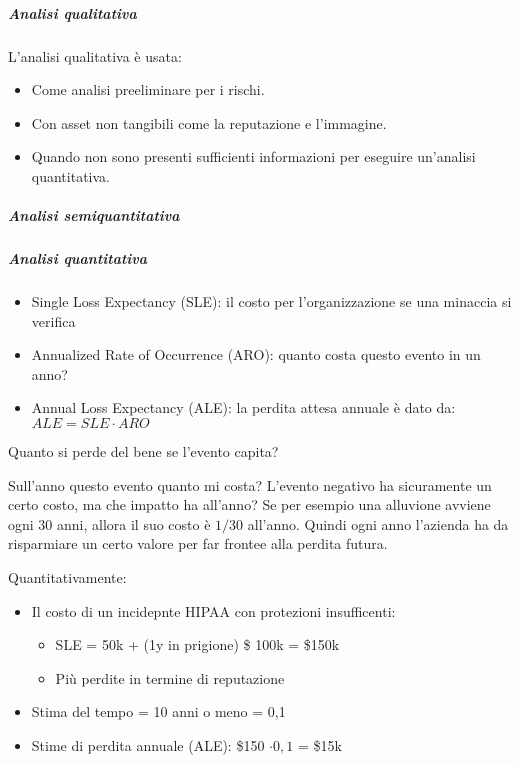 \subparagraph*{Analisi qualitativa}

L'analisi qualitativa è usata:
\begin{itemize}
\item Come analisi preeliminare per i rischi.
\item Con asset non tangibili come la reputazione e l'immagine.
\item Quando non sono presenti sufficienti informazioni per eseguire un'analisi quantitativa.
\end{itemize}



\subparagraph*{Analisi semiquantitativa}


\subparagraph*{Analisi quantitativa}

\begin{itemize}
\item Single Loss Expectancy (SLE): il costo per l'organizzazione se una
minaccia si verifica
\item Annualized Rate of Occurrence (ARO): quanto costa questo evento in un
anno?
\item Annual Loss Expectancy (ALE): la perdita attesa annuale è dato da: $ALE =
SLE \cdot ARO$
\end{itemize}


Quanto si perde del bene se l'evento capita?

Sull'anno questo evento quanto mi costa? L'evento negativo ha sicuramente un
certo costo, ma che impatto ha all'anno? Se per esempio una alluvione avviene
ogni 30 anni, allora il suo costo è $1/30$ all'anno. Quindi ogni anno l'azienda
ha da risparmiare un certo valore per far frontee alla perdita futura.



Quantitativamente:
\begin{itemize}
\item Il costo di un incidepnte HIPAA con protezioni insufficenti:
\begin{itemize}
 \item SLE = 50k + (1y in prigione) \$ 100k = \$150k
 \item Più perdite in termine di reputazione
\end{itemize}
\item Stima del tempo = 10 anni o meno = 0,1
\item Stime di perdita annuale (ALE): \$150 $\cdot 0,1$ = \$15k
\end{itemize}

